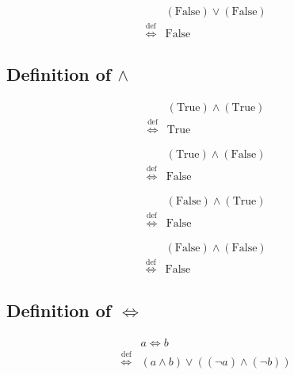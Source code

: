 \begin{defn}
\label{Definition:lor_False_False}
\begin{align*}
& (\text{False}) \lor (\text{False}) \\
\overset{\operatorname{def}}{\iff} & \text{False}
\end{align*}
\end{defn}

\subsection{Definition of $\land$}
\begin{defn}
\label{Definition:land_True_True}
\begin{align*}
& (\text{True}) \land (\text{True}) \\
\overset{\operatorname{def}}{\iff} & \text{True}
\end{align*}
\end{defn}

\begin{defn}
\label{Definition:land_True_False}
\begin{align*}
& (\text{True}) \land (\text{False}) \\
\overset{\operatorname{def}}{\iff} & \text{False}
\end{align*}
\end{defn}

\begin{defn}
\label{Definition:land_False_True}
\begin{align*}
& (\text{False}) \land (\text{True}) \\
\overset{\operatorname{def}}{\iff} & \text{False}
\end{align*}
\end{defn}

\begin{defn}
\label{Definition:land_False_False}
\begin{align*}
& (\text{False}) \land (\text{False}) \\
\overset{\operatorname{def}}{\iff} & \text{False}
\end{align*}
\end{defn}

\subsection{Definition of $\iff$}
\begin{defn}
\label{Definition:iff}
\begin{align*}
& a \iff b \\
\overset{\operatorname{def}}{\iff} & (a \land b) \lor ((\lnot a) \land (\lnot b))
\end{align*}
\end{defn}

